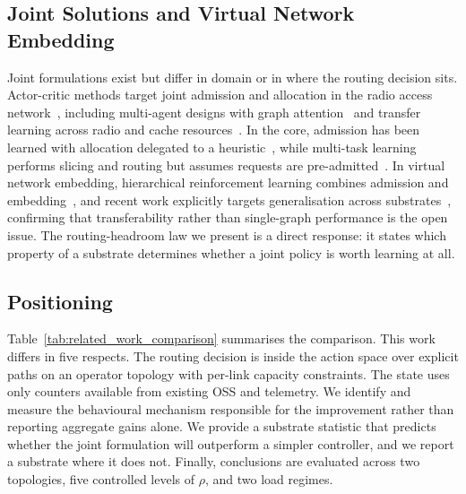 \documentclass[10pt,journal,comsoc]{IEEEtran}
\begin{document}
\subsection{Joint Solutions and Virtual Network Embedding}
Joint formulations exist but differ in domain or in where the routing
decision sits. Actor-critic methods target joint admission and allocation
in the radio access network~\cite{Rezazadeh2021ZerotouchCN,9322237},
including multi-agent designs with graph attention~\cite{9953137} and
transfer learning across radio and cache
resources~\cite{zhou2022learning}. In the core, admission has been learned
with allocation delegated to a heuristic~\cite{li2023reinforcement}, while
multi-task learning performs slicing and routing but assumes requests are
pre-admitted~\cite{9655323}. In virtual network embedding, hierarchical
reinforcement learning combines admission and
embedding~\cite{xiong2024hrlacra}, and recent work explicitly targets
generalisation across substrates~\cite{wang2024flagvne}, confirming that
transferability rather than single-graph performance is the open issue.
The routing-headroom law we present is a direct response: it states which
property of a substrate determines whether a joint policy is worth
learning at all.

\subsection{Positioning}
Table~\ref{tab:related_work_comparison} summarises the comparison. This
work differs in five respects. The routing decision is inside the action
space over explicit paths on an operator topology with per-link capacity
constraints. The state uses only counters available from existing OSS and
telemetry. We identify and measure the behavioural mechanism responsible
for the improvement rather than reporting aggregate gains alone. We
provide a substrate statistic that predicts whether the joint formulation
will outperform a simpler controller, and we report a substrate where it
does not. Finally, conclusions are evaluated across two topologies, five
controlled levels of $\rho$, and two load regimes.
\end{document}
